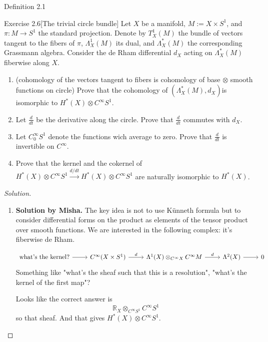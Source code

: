 \begin{thing3}{Definition 2.1}
\begin{thing4}{Exercise 2.6}[The trivial circle bundle]\label{exer:2.6}\leavevmode
Let \(X\) be a manifold, \(M:=X \times S^1\), and \(\pi:M \to S^1\) the standard projection. Denote by \(T^1_X(M)\) the bundle of vectors tangent to the fibers of \(\pi\), \(\Lambda^{1}_X(M)\) its dual, and \(\Lambda^{*}_X(M)\) the corresponding Grassmann algebra. Consider the de Rham differential \(d_X\) acting on \(\Lambda^{*}_X(M)\) fiberwise along \(X\).

\begin{enumerate}[label=(\alph*)]
\item {\color{6}(cohomology of the vectors tangent to fibers is cohomology of base \(\otimes\) smooth functions on circle)} Prove that the cohomology of \((\Lambda^{*}_X(M),d_X)\)is isomorphic to \(H^{*}(X)\otimes C^\infty S^1\).
\item Let \(\frac{d}{dt}\) be the derivative along the circle. Prove that \(\frac{d}{dt}\) commutes with \(d_X\).
\item Let \(C^\infty_0S^1\) denote the functions wich average to zero. Prove that \(\frac{d}{dt}\) is invertible on \(C^\infty\).
\item Prove that the kernel and the cokernel of \(H^{*}(X)\otimes C^\infty S^1\xrightarrow{d/dt}H^{*}(X)\otimes C^\infty S^1\) are naturally isomorphic to \(H^{*}(X)\).
\end{enumerate}
\end{thing4}

\begin{proof}[Solution]\leavevmode
\begin{enumerate}
\item 
\textbf{Solution by Misha.}  The key idea is not to use Künneth formula but to consider differential forms on the product as elements of the tensor product over smooth functions. We are interested in the following complex: it's fiberwise de Rham.

\[\begin{tikzcd}\text{what's the kernel?} \arrow[r]&C^\infty(X \times S^1)\arrow[r,"d"]&\Lambda^{1}(X)\otimes_{C^\infty X}C^\infty M\arrow[r,"d"]&\Lambda^{2}(X)\arrow[r]&0\end{tikzcd}\]
Something like "what's the sheaf such that this is a resolution", "what's the kernel of the first map"?

Looks like the correct answer is
\[\mathbb{R}_X \otimes_{C^\infty S^1} C^\infty S^1\]
so that sheaf. And that gives \(H^{*}(X)\otimes C^\infty S^1\).


\end{enumerate}
\end{proof}
\end{thing3}
